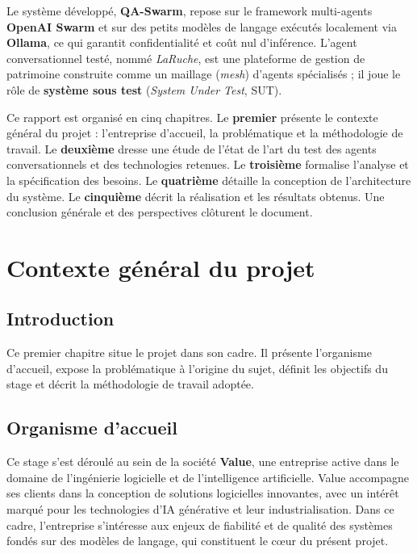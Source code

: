 \documentclass[12pt,a4paper,oneside]{report}
\newcommand{\sut}{\textit{LaRuche}}
\begin{document}
Le système développé, \textbf{QA-Swarm}, repose sur le framework multi-agents
\textbf{OpenAI Swarm} et sur des petits modèles de langage exécutés localement via
\textbf{Ollama}, ce qui garantit confidentialité et coût nul d'inférence. L'agent
conversationnel testé, nommé \sut{}, est une plateforme de gestion de patrimoine
construite comme un maillage (\textit{mesh}) d'agents spécialisés ; il joue le rôle de
\textbf{système sous test} (\textit{System Under Test}, SUT).

Ce rapport est organisé en cinq chapitres. Le \textbf{premier} présente le contexte
général du projet : l'entreprise d'accueil, la problématique et la méthodologie de
travail. Le \textbf{deuxième} dresse une étude de l'état de l'art du test des agents
conversationnels et des technologies retenues. Le \textbf{troisième} formalise
l'analyse et la spécification des besoins. Le \textbf{quatrième} détaille la
conception de l'architecture du système. Le \textbf{cinquième} décrit la réalisation
et les résultats obtenus. Une conclusion générale et des perspectives clôturent le
document.

\chapter{Contexte général du projet}

\section{Introduction}
Ce premier chapitre situe le projet dans son cadre. Il présente l'organisme
d'accueil, expose la problématique à l'origine du sujet, définit les objectifs du
stage et décrit la méthodologie de travail adoptée.

\section{Organisme d'accueil}
Ce stage s'est déroulé au sein de la société \textbf{Value}, une entreprise active
dans le domaine de l'ingénierie logicielle et de l'intelligence artificielle. Value
accompagne ses clients dans la conception de solutions logicielles innovantes, avec un
intérêt marqué pour les technologies d'IA générative et leur industrialisation. Dans
ce cadre, l'entreprise s'intéresse aux enjeux de fiabilité et de qualité des systèmes
fondés sur des modèles de langage, qui constituent le cœur du présent projet.
\end{document}
